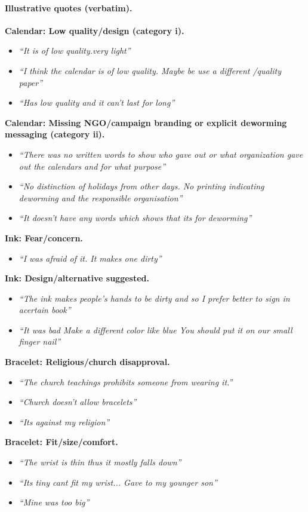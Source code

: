 \documentclass[12pt,a4paper]{article}
\begin{document}
\paragraph{Illustrative quotes (verbatim).}
\textbf{Calendar: Low quality/design (category i).}
\begin{itemize}
\item \emph{``It is of low quality.very light''}
\item \emph{``I think the calendar is of low quality. Maybe be use a different /quality paper''}
\item \emph{``Has low quality and it can't last for long''}
\end{itemize}
\textbf{Calendar: Missing NGO/campaign branding or explicit deworming messaging (category ii).}
\begin{itemize}
\item \emph{``There was no written words to show who gave out or what organization gave out the calendars and for what purpose''}
\item \emph{``No distinction of holidays from other days. No printing indicating deworming and the responsible organisation''}
\item \emph{``It doesn't have any words which shows that its for deworming''}
\end{itemize}
\textbf{Ink: Fear/concern.}
\begin{itemize}
\item \emph{``I was afraid of it. It makes one dirty''}
\end{itemize}
\textbf{Ink: Design/alternative suggested.}
\begin{itemize}
\item \emph{``The ink makes people's hands to be dirty and so I prefer better to sign in acertain book''}
\item \emph{``It was bad Make a different color like blue You should put it on our small finger nail''}
\end{itemize}
\textbf{Bracelet: Religious/church disapproval.}
\begin{itemize}
\item \emph{``The church teachings prohibits someone from wearing it.''}
\item \emph{``Church doesn't allow bracelets''}
\item \emph{``Its against  my religion''}
\end{itemize}
\textbf{Bracelet: Fit/size/comfort.}
\begin{itemize}
\item \emph{``The wrist is thin thus it mostly falls down''}
\item \emph{``Its tiny cant fit my wrist... Gave to my younger son''}
\item \emph{``Mine was too big''}
\end{itemize}
\end{document}
